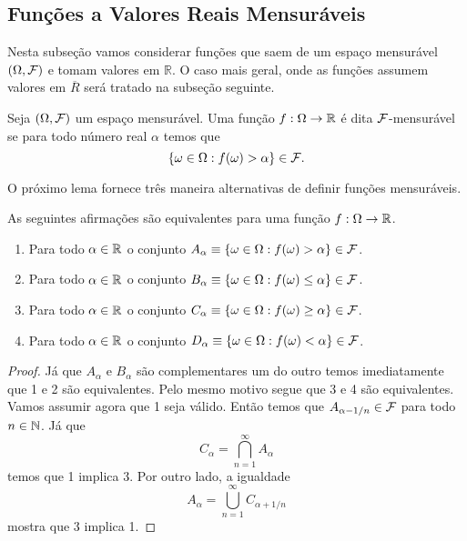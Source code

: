 \subsection*{Funções a Valores Reais Mensuráveis}

Nesta subseção vamos considerar funções que
saem de um espaço mensurável $(\Omega,\mathcal{F})$ e tomam 
valores em $\mathbb{R}$. O caso mais geral, onde
as funções assumem valores em $\overline{R}$ será
tratado na subseção seguinte.


\begin{definicao} 
Seja $(\Omega,\mathcal{F})$ um espaço mensurável. 
Uma função $f:\Omega\to\mathbb{R}$ é dita $\mathcal{F}$-mensurável
se para todo número real $\alpha$ temos que
\[
	\{\omega \in\Omega : f(\omega)>\alpha \} \in \mathcal{F}.
\]
\end{definicao}

O próximo lema fornece três maneira alternativas de
definir funções mensuráveis. 

\begin{lema}
As seguintes afirmações são equivalentes para uma função 
$f:\Omega\to\mathbb{R}$.
\begin{enumerate}
	\item 
	Para todo $\alpha\in\mathbb{R}$ o conjunto 
	$A_{\alpha}\equiv\{\omega\in\Omega : f(\omega)>\alpha \} \in \mathcal{F}$.

	\item 
	Para todo $\alpha\in\mathbb{R}$ o conjunto 
	$B_{\alpha}\equiv\{\omega\in\Omega : f(\omega)\leq \alpha \} \in \mathcal{F}$.

	\item 
	Para todo $\alpha\in\mathbb{R}$ o conjunto 
	$C_{\alpha}\equiv\{\omega\in\Omega : f(\omega)\geq\alpha \} \in \mathcal{F}$.

	\item 
	Para todo $\alpha\in\mathbb{R}$ o conjunto 
	$D_{\alpha}\equiv\{\omega\in\Omega : f(\omega)<\alpha \} \in \mathcal{F}$.
	
\end{enumerate}
\end{lema}


\begin{proof}
	Já que $A_{\alpha}$ e $B_{\alpha}$ são complementares um do outro
	temos imediatamente que 1 e 2 são equivalentes. Pelo mesmo 
	motivo segue que 3 e 4 são equivalentes. Vamos assumir agora que 
	1 seja válido. Então temos que $A_{\alpha-1/n}\in \mathcal{F}$ para todo
	$n\in\mathbb{N}$. Já que 
	\[ 
		C_{\alpha} = \bigcap_{n=1}^{\infty} A_{\alpha} 
	\]
	temos que 1 implica 3. Por outro lado, a igualdade
	\[
		A_{\alpha} = \bigcup_{n=1}^{\infty} C_{\alpha+1/n}
	\]
	mostra que 3 implica 1.
\end{proof}



